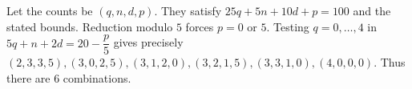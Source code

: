 Let the counts be $(q,n,d,p)$. They satisfy $25q+5n+10d+p=100$ and the stated bounds. Reduction modulo $5$ forces $p=0$ or $5$. Testing $q=0,\ldots,4$ in $5q+n+2d=20-\dfrac{p}{5}$ gives precisely $(2,3,3,5),(3,0,2,5),(3,1,2,0),(3,2,1,5),(3,3,1,0),(4,0,0,0)$. Thus there are $\boxed6$ combinations.
